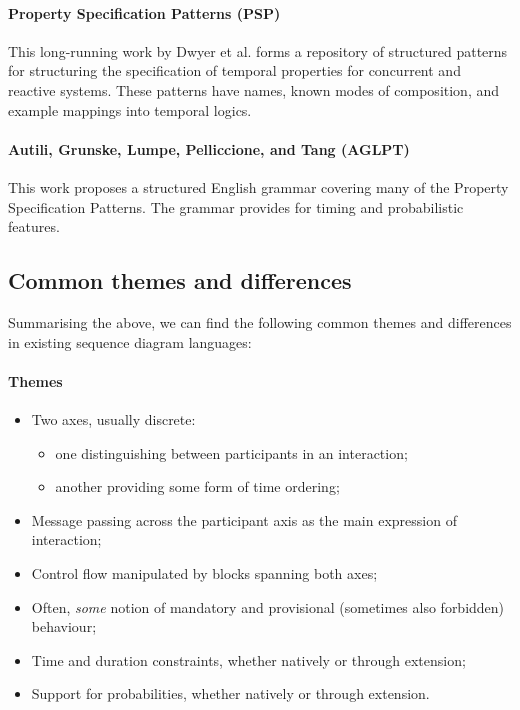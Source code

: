 \paragraph{Property Specification Patterns (PSP)}

This long-running work by Dwyer et al. forms a repository of
structured patterns for structuring the specification of temporal
properties for concurrent and reactive systems.  These patterns have names,
known modes of composition, and example mappings into temporal logics.

\paragraph{Autili, Grunske, Lumpe, Pelliccione, and Tang (AGLPT)}

This work proposes a structured English grammar covering many of the Property
Specification Patterns.  The grammar provides for timing and probabilistic
features.

\subsection{Common themes and differences}

Summarising the above, we can find the following common
themes and differences in existing sequence
diagram languages:

\paragraph{Themes}

\begin{itemize}
\item
  Two axes, usually discrete:
  \begin{itemize}
  \item
    one distinguishing between participants in an interaction;
  \item
    another providing some form of time ordering;
  \end{itemize}
\item
  Message passing across the participant axis as the main expression of
  interaction;
\item
  Control flow manipulated by blocks 
  spanning both axes;
\item
  Often, \emph{some} notion of mandatory and provisional
  (sometimes also forbidden) behaviour;
\item
  Time and duration constraints, whether natively or through extension;
\item
  Support for probabilities, whether natively or through extension.
\end{itemize}

